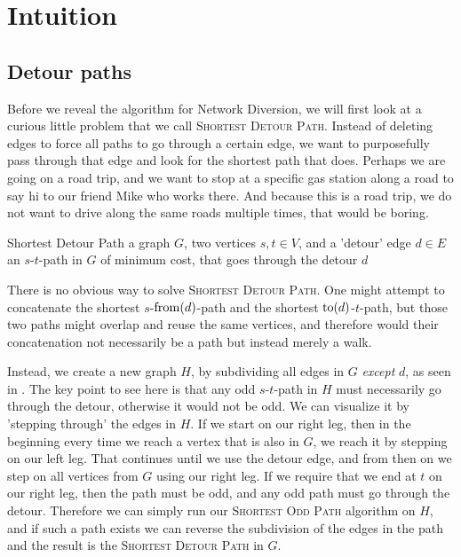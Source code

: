 \section{Intuition}
\subsection{Detour paths}
\label{section:subdividing-detours}
Before we reveal the algorithm for Network Diversion, we will first look at a curious little problem that we call \textsc{Shortest Detour Path}. Instead of deleting edges to force all paths to go through a certain edge, we want to purposefully pass through that edge and look for the shortest path that does. Perhaps we are going on a road trip, and we want to stop at a specific gas station along a road to say hi to our friend Mike who works there. And because this is a road trip, we do not want to drive along the same roads multiple times, that would be boring.

\problem
{Shortest Detour Path}
{a graph $G$, two vertices $s,t \in V$, and a 'detour' edge $d \in E$}
{an $s$-$t$-path in $G$ of minimum cost, that goes through the detour $d$}

There is no obvious way to solve \textsc{Shortest Detour Path}. One might attempt to concatenate the shortest $s$-$\operatorname{from}(d)$-path and the shortest $\operatorname{to}(d)$-$t$-path, but those two paths might overlap and reuse the same vertices, and therefore would their concatenation not necessarily be a path but instead merely a walk.

Instead, we create a new graph $H$, by subdividing all edges in $G$ \emph{except} $d$, as seen in . The key point to see here is that any odd $s$-$t$-path in $H$ must necessarily go through the detour, otherwise it would not be odd. We can visualize it by 'stepping through' the edges in $H$. If we start on our right leg, then in the beginning every time we reach a vertex that is also in $G$, we reach it by stepping on our left leg. That continues until we use the detour edge, and from then on we step on all vertices from $G$ using our right leg. If we require that we end at $t$ on our right leg, then the path must be odd, and any odd path must go through the detour. Therefore we can simply run our \textsc{Shortest Odd Path} algorithm on $H$, and if such a path exists we can reverse the subdivision of the edges in the path and the result is the \textsc{Shortest Detour Path} in $G$.

